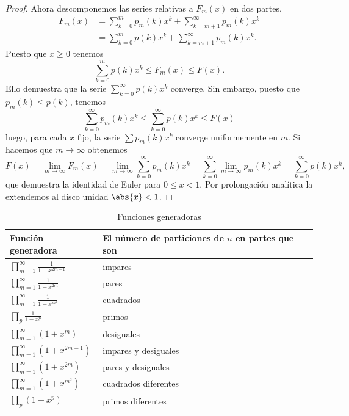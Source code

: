 \documentclass[12pt,a4paper]{book}
\begin{document}
\begin{proof}
        Ahora descomponemos las series relativas a $F_{m}(x)$ en dos partes,
        \begin{align*}
            F_{m}(x)&=\sum_{k=0}^{m}p_{m}(k)x^{k}+\sum_{k=m+1}^{\infty}p_{m}(k)x^{k}\\
            &=\sum_{k=0}^{m}p(k)x^{k}+\sum_{k=m+1}^{\infty}p_{m}(k)x^{k}.
        \end{align*}
        Puesto que $x\geq0$ tenemos
        \begin{equation*}
            \sum_{k=0}^{m}p(k)x^{k}\leq F_{m}(x)\leq F(x).
        \end{equation*}
        Ello demuestra que la serie $\sum_{k=0}^{\infty}p(k)x^{k}$ converge. Sin embargo, puesto
        que $p_{m}(k)\leq p(k)$, tenemos
        \begin{equation*}
            \sum_{k=0}^{\infty}p_{m}(k)x^{k}\leq\sum_{k=0}^{\infty}p(k)x^{k}\leq F(x)
        \end{equation*}
        luego, para cada $x$ fijo, la serie $\sum p_{m}(k)x^{k}$ converge uniformemente en $m$. Si
        hacemos que $m\to\infty$ obtenemos
        \begin{equation*}
            F(x)=\lim_{m\to\infty}F_{m}(x)=\lim_{m\to\infty}\sum_{k=0}^{\infty}p_{m}(k)x^{k}=\sum_{k=0}^{\infty}\lim_{m\to\infty}p_{m}(k)x^{k}=\sum_{k=0}^{\infty}p(k)x^{k},
        \end{equation*}
        que demuestra la identidad de Euler para $0\leq x<1$. Por prolongación analítica la
        extendemos al disco unidad $\abs{x}<1$.
    \end{proof}

    \begin{table}[H]
        \centering
        \caption{Funciones generadoras}
        \begin{tabular}{@{}lp{5.5cm}@{}}
            \hline
            Función generadora&El número de particiones de $n$ en partes que son\\\hline
            $\displaystyle\prod_{m=1}^{\infty}\frac{1}{1-x^{2m-1}}$&impares\\[2.5ex]
            $\displaystyle\prod_{m=1}^{\infty}\frac{1}{1-x^{2m}}$&pares\\[2.5ex]
            $\displaystyle\prod_{m=1}^{\infty}\frac{1}{1-x^{m^{2}}}$&cuadrados\\[2.5ex]
            $\displaystyle\prod_{p}\frac{1}{1-x^{p}}$&primos\\[2.5ex]
            $\displaystyle\prod_{m=1}^{\infty}(1+x^{m})$&desiguales\\[2.5ex]
            $\displaystyle\prod_{m=1}^{\infty}(1+x^{2m-1})$&impares y desiguales\\[2.5ex]
            $\displaystyle\prod_{m=1}^{\infty}(1+x^{2m})$&pares y desiguales\\[2.5ex]
            $\displaystyle\prod_{m=1}^{\infty}(1+x^{m^{2}})$&cuadrados diferentes\\[2.5ex]
            $\displaystyle\prod_{p}(1+x^{p})$&primos diferentes\\\hline
        \end{tabular}
    \end{table}
\end{document}
